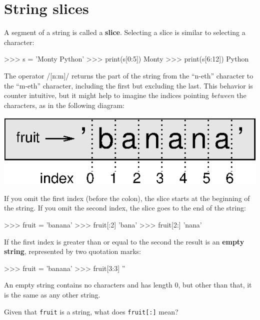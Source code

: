 \section{String slices}
\label{slice}


A segment of a string is called a {\bf slice}.  Selecting a slice is
similar to selecting a character:

\beforeverb
\begin{pyinterpreter}
>>> s = 'Monty Python'
>>> print(s[0:5])
Monty
>>> print(s[6:12])
Python
\end{pyinterpreter}
\afterverb
%
The operator {\pyinline/[n:m]/} returns the part of the string from the 
``n-eth'' character to the ``m-eth'' character, including the first but
excluding the last.  This behavior is counter intuitive, but it might
help to imagine the indices pointing {\em between} the
characters, as in the following diagram:

\beforefig
\centerline{\includegraphics{figs/banana.eps}}
\afterfig

If you omit the first index (before the colon), the slice starts at
the beginning of the string.  If you omit the second index, the slice
goes to the end of the string:

\beforeverb
\begin{pyinterpreter}
>>> fruit = 'banana'
>>> fruit[:2]
'bana'
>>> fruit[2:]
'nana'
\end{pyinterpreter}
\afterverb
%
If the first index is greater than or equal to the second the result
is an {\bf empty string}, represented by two quotation marks:


\beforeverb
\begin{pyinterpreter}
>>> fruit = 'banana'
>>> fruit[3:3]
''
\end{pyinterpreter}
\afterverb
%
An empty string contains no characters and has length 0, but other
than that, it is the same as any other string.

\begin{exercise}
Given that {\tt fruit} is a string, what does
{\tt fruit[:]} mean?



\end{exercise}


